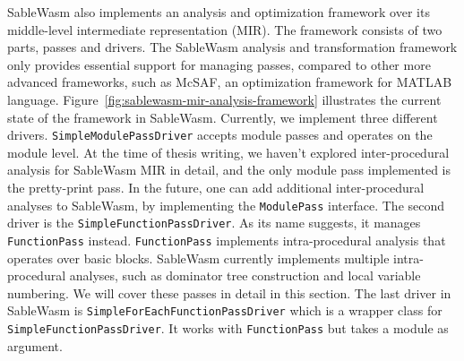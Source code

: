 SableWasm also implements an analysis and optimization framework over its
middle-level intermediate representation (MIR). The framework consists of two
parts, passes and drivers. The SableWasm analysis and transformation framework
only provides essential support for managing passes, compared to other more
advanced frameworks, such as McSAF\cite{mcsaf}, an optimization framework for
MATLAB language. Figure~\ref{fig:sablewasm-mir-analysis-framework} illustrates
the current state of the framework in SableWasm. Currently, we implement three
different drivers. \texttt{SimpleModulePassDriver} accepts module passes and
operates on the module level. At the time of thesis writing, we haven't explored
inter-procedural analysis for SableWasm MIR in detail, and the only module pass
implemented is the pretty-print pass. In the future, one can add additional
inter-procedural analyses to SableWasm, by implementing the \texttt{ModulePass}
interface. The second driver is the \texttt{SimpleFunctionPassDriver}. As its
name suggests, it manages \texttt{FunctionPass} instead. \texttt{FunctionPass}
implements intra-procedural analysis that operates over basic blocks. SableWasm
currently implements multiple intra-procedural analyses, such as dominator tree
construction and local variable numbering. We will cover these passes in detail
in this section. The last driver in SableWasm is
\texttt{SimpleForEachFunctionPassDriver} which is a wrapper class for
\texttt{SimpleFunctionPassDriver}. It works with \texttt{FunctionPass} but takes
a module as argument.




